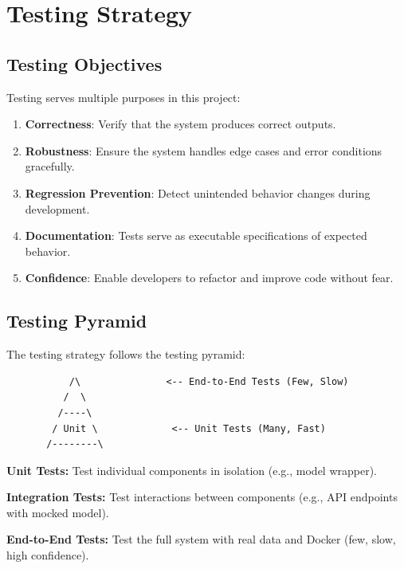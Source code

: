 \section{Testing Strategy}
\label{sec:testing}

\subsection{Testing Objectives}

Testing serves multiple purposes in this project:

\begin{enumerate}
  \item \textbf{Correctness}: Verify that the system produces correct outputs.
  
  \item \textbf{Robustness}: Ensure the system handles edge cases and error conditions gracefully.
  
  \item \textbf{Regression Prevention}: Detect unintended behavior changes during development.
  
  \item \textbf{Documentation}: Tests serve as executable specifications of expected behavior.
  
  \item \textbf{Confidence}: Enable developers to refactor and improve code without fear.
\end{enumerate}

\subsection{Testing Pyramid}

The testing strategy follows the testing pyramid:

\begin{verbatim}
           /\               <-- End-to-End Tests (Few, Slow)
          /  \
         /----\
        / Unit \             <-- Unit Tests (Many, Fast)
       /--------\
\end{verbatim}

\textbf{Unit Tests:} Test individual components in isolation (e.g., model wrapper).

\textbf{Integration Tests:} Test interactions between components (e.g., API endpoints with mocked model).

\textbf{End-to-End Tests:} Test the full system with real data and Docker (few, slow, high confidence).

